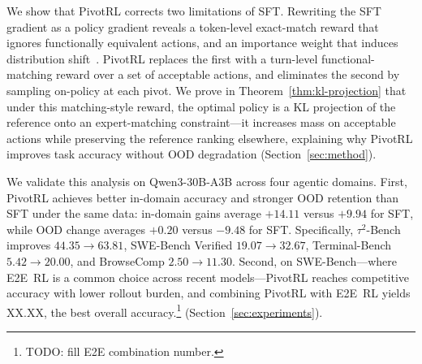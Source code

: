We show that PivotRL corrects two limitations of SFT\@.
Rewriting the SFT gradient as a policy gradient reveals a token-level exact-match reward that ignores functionally equivalent actions, and an importance weight that induces distribution shift~\citep{wu2025generalization}.
PivotRL replaces the first with a turn-level functional-matching reward over a set of acceptable actions, and eliminates the second by sampling on-policy at each pivot.
We prove in Theorem~\ref{thm:kl-projection} that under this matching-style reward, the optimal policy is a KL projection of the reference onto an expert-matching constraint---it increases mass on acceptable actions while preserving the reference ranking elsewhere, explaining why PivotRL improves task accuracy without OOD degradation (Section~\ref{sec:method}).

We validate this analysis on Qwen3-30B-A3B across four agentic domains.
First, PivotRL achieves better in-domain accuracy and stronger OOD retention than SFT under the same data: in-domain gains average $+14.11$ versus $+9.94$ for SFT, while OOD change averages $+0.20$ versus $-9.48$ for SFT\@.
Specifically, $\tau^2$-Bench improves $44.35 \to 63.81$, SWE-Bench Verified $19.07 \to 32.67$, Terminal-Bench $5.42 \to 20.00$, and BrowseComp $2.50 \to 11.30$.
Second, on SWE-Bench---where E2E~RL is a common choice across recent models---PivotRL reaches competitive accuracy with lower rollout burden, and combining PivotRL with E2E~RL yields XX.XX, the best overall accuracy.\footnote{TODO: fill E2E combination number.}
(Section~\ref{sec:experiments}).


\newcommand{\diagcorner}{%
  \begin{tikzpicture}[baseline=(current bounding box.center)]
    \node[inner sep=0pt] (cell) at (0,0) {%
      \begin{minipage}{3.4cm}
        \vspace{0.5em}
        \hfill {\small{Signal}}\\[-0.2em]
        {\small{Compute}}\hfill\mbox{}
        \vspace{0.1em}
      \end{minipage}%
    };
    \draw (cell.north west) -- (cell.south east);
  \end{tikzpicture}%
}

